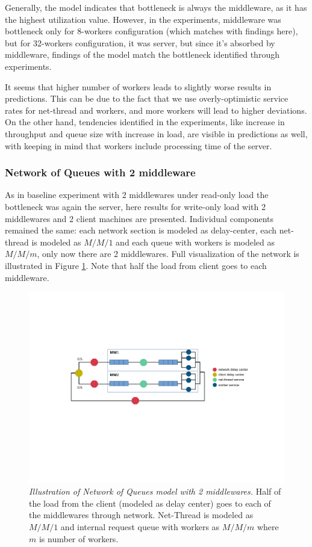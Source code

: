 \documentclass[11pt,a4paper]{article}
\begin{document}
Generally, the model indicates that bottleneck is always the middleware, as it has the highest utilization value. However, in the experiments, middleware was bottleneck only for 8-workers configuration (which matches with findings here), but for 32-workers configuration, it was server, but since it's absorbed by middleware, findings of the model match the bottleneck identified through experiments.

It seems that higher number of workers leads to slightly worse results in predictions. This can be due to the fact that we use overly-optimistic service rates for net-thread and workers, and more workers will lead to higher deviations. On the other hand, tendencies identified in the experiments, like increase in throughput and queue size with increase in load, are visible in predictions as well, with keeping in mind that workers include processing time of the server.

\subsubsection{Network of Queues with 2 middleware}

As in baseline experiment with 2 middlewares under read-only load the bottleneck was again the server, here results for write-only load with 2 middlewares and 2 client machines are presented. Individual components remained the same: each network section is modeled as delay-center, each net-thread is modeled as $M/M/1$ and each queue with workers is modeled as $M/M/m$, only now there are 2 middlewares. Full visualization of the network is illustrated in Figure \ref{Figure:nog_2midd}. Note that half the load from client goes to each middleware.

\begin{figure}[ht!]
	\centering		
	\includegraphics[width=1\linewidth]{../plots/noq_model_2midd.pdf}	
	\caption{\textit{Illustration of Network of Queues model with 2 middlewares.} Half of the load from the client (modeled as delay center) goes to each of the middlewares through network. Net-Thread is modeled as $M/M/1$ and internal request queue with workers as $M/M/m$ where $m$ is number of workers.}
	\label{Figure:nog_2midd}	
\end{figure}
\end{document}
